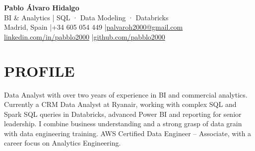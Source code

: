 \documentclass[a4paper,10pt]{article}
\begin{document}
{\LARGE\bfseries Pablo Álvaro Hidalgo}\\[3pt]
{\large\color{accent} BI \& Analytics | SQL · Data Modeling · Databricks}\\[5pt]
\small
Madrid, Spain \enspace|\enspace +34 605 054 449 \enspace|\enspace \href{mailto:palvaroh2000@gmail.com}{palvaroh2000@gmail.com}\\[2pt]
\href{https://www.linkedin.com/in/pabblo2000/}{linkedin.com/in/pabblo2000} \enspace|\enspace \href{https://github.com/pabblo2000}{github.com/pabblo2000}
\normalsize

\section{PROFILE}
Data Analyst with over two years of experience in BI and commercial analytics. Currently a CRM Data Analyst at Ryanair, working with complex SQL and Spark SQL queries in Databricks, advanced Power BI and reporting for senior leadership. I combine business understanding and a strong grasp of data grain with data engineering training. AWS Certified Data Engineer -- Associate, with a career focus on Analytics Engineering.
\end{document}
